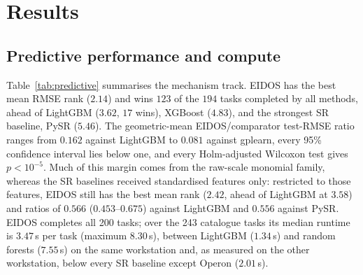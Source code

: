 \FloatBarrier

\section{Results}\label{sec:results}

\subsection{Predictive performance and compute}\label{sec:predictiveresults}

Table~\ref{tab:predictive} summarises the mechanism track. EIDOS has the best mean RMSE rank (\(2.14\)) and wins \(123\) of the \(194\) tasks completed by all methods, ahead of LightGBM (\(3.62\), \(17\) wins), XGBoost (\(4.83\)), and the strongest SR baseline, PySR (\(5.46\)). The geometric-mean EIDOS/comparator test-RMSE ratio ranges from \(0.162\) against LightGBM to \(0.081\) against gplearn, every 95\% confidence interval lies below one, and every Holm-adjusted Wilcoxon test gives \(p<10^{-5}\). Much of this margin comes from the raw-scale monomial family, whereas the SR baselines received standardised features only: restricted to those features, EIDOS still has the best mean rank (\(2.42\), ahead of LightGBM at \(3.58\)) and ratios of \(0.566\) (\(0.453\)--\(0.675\)) against LightGBM and \(0.556\) against PySR. EIDOS completes all 200 tasks; over the 243 catalogue tasks its median runtime is \(3.47\)\,s per task (maximum \(8.30\)\,s), between LightGBM (\(1.34\)\,s) and random forests (\(7.55\)\,s) on the same workstation and, as measured on the other workstation, below every SR baseline except Operon (\(2.01\)\,s).

